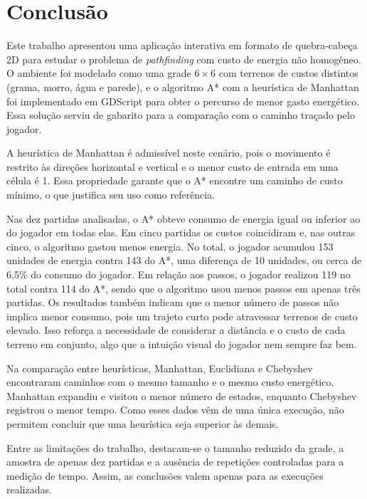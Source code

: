 \chapter{Conclusão}
\label{cap:conclusao}

Este trabalho apresentou uma aplicação interativa em formato de quebra-cabeça 2D para estudar o problema de \textit{pathfinding} com custo de energia não homogêneo. O ambiente foi modelado como uma grade $6 \times 6$ com terrenos de custos distintos (grama, morro, água e parede), e o algoritmo A* com a heurística de Manhattan foi implementado em GDScript para obter o percurso de menor gasto energético. Essa solução serviu de gabarito para a comparação com o caminho traçado pelo jogador.

A heurística de Manhattan é admissível neste cenário, pois o movimento é restrito às direções horizontal e vertical e o menor custo de entrada em uma célula é 1. Essa propriedade garante que o A* encontre um caminho de custo mínimo, o que justifica seu uso como referência.

Nas dez partidas analisadas, o A* obteve consumo de energia igual ou inferior ao do jogador em todas elas. Em cinco partidas os custos coincidiram e, nas outras cinco, o algoritmo gastou menos energia. No total, o jogador acumulou 153 unidades de energia contra 143 do A*, uma diferença de 10 unidades, ou cerca de 6,5\% do consumo do jogador. Em relação aos passos, o jogador realizou 119 no total contra 114 do A*, sendo que o algoritmo
usou menos passos em apenas três partidas. Os resultados também indicam que o menor número de passos não implica menor consumo, pois um trajeto curto pode atravessar terrenos de custo elevado. Isso reforça a necessidade de considerar a distância e o custo de cada terreno em conjunto, algo que a intuição visual do jogador nem sempre faz bem.

Na comparação entre heurísticas, Manhattan, Euclidiana e Chebyshev encontraram caminhos com o mesmo tamanho e o mesmo custo energético. Manhattan expandiu e visitou o menor número de estados, enquanto Chebyshev registrou o menor tempo. Como esses dados vêm de uma única execução, não permitem concluir que uma heurística seja superior às demais.

Entre as limitações do trabalho, destacam-se o tamanho reduzido da grade, a amostra de apenas dez partidas e a ausência de repetições controladas para a medição de tempo. Assim, as conclusões valem apenas para as execuções realizadas.

